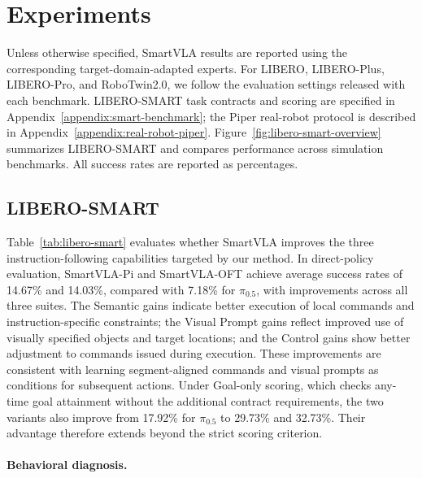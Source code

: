 \hypertarget{experiments}{%
\section{Experiments}\label{experiments}}

Unless otherwise specified, SmartVLA results are reported using the corresponding
target-domain-adapted experts. For LIBERO, LIBERO-Plus, LIBERO-Pro, and RoboTwin2.0, we follow the
evaluation settings released with each benchmark. LIBERO-SMART task contracts and scoring are
specified in Appendix~\ref{appendix:smart-benchmark}; the Piper real-robot protocol is described in
Appendix~\ref{appendix:real-robot-piper}. Figure~\ref{fig:libero-smart-overview} summarizes
LIBERO-SMART and compares performance across simulation benchmarks. All success rates are reported
as percentages.

\subsection{LIBERO-SMART}\label{libero-smart-1}

%

%

\begingroup
\leavevmode
Table~\ref{tab:libero-smart} evaluates whether SmartVLA improves the three instruction-following
capabilities targeted by our method. In direct-policy evaluation, SmartVLA-Pi and SmartVLA-OFT
achieve average success rates of 14.67\% and 14.03\%, compared with 7.18\% for $\pi_{0.5}$, with
improvements across all three suites. The Semantic gains indicate better execution of local commands
and instruction-specific constraints; the Visual Prompt gains reflect improved use of visually
specified objects and target locations; and the Control gains show better adjustment to commands
issued during execution. These improvements are consistent with learning segment-aligned commands
and visual prompts as conditions for subsequent actions. Under Goal-only scoring, which checks
any-time goal attainment without the additional contract requirements, the two variants also improve
from 17.92\% for $\pi_{0.5}$ to 29.73\% and 32.73\%. Their advantage therefore extends beyond the
strict scoring criterion.
\par
\endgroup

\paragraph{Behavioral diagnosis.}

